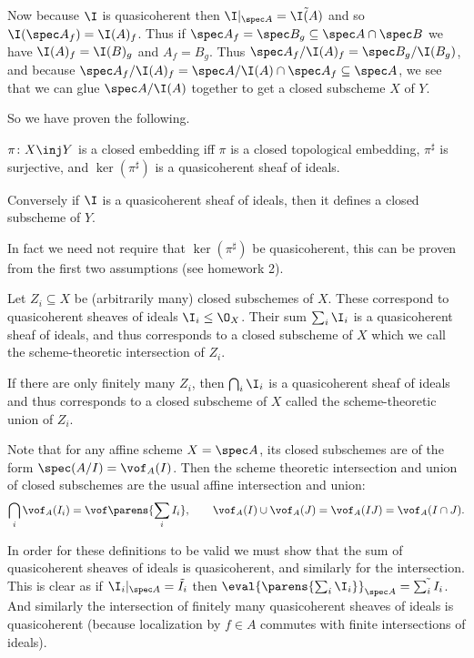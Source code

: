 Now because $\I$ is quasicoherent then $\I|_{\spec A}=\tilde{\I(A)}$ and so $\I(\spec A_f)=\I(A)_f$.
Thus if $\spec A_f=\spec B_g\subseteq\spec A\cap\spec B$ we have $\I(A)_f=\I(B)_g$ and $A_f=B_g$.
Thus $\spec A_f/\I(A)_f=\spec B_g/\I(B_g)$, and because $\spec A_f/\I(A)_f=\spec A/\I(A)\cap\spec A_f\subseteq\spec A$, we see that we can glue
$\spec A/\I(A)$ together to get a closed subscheme $X$ of $Y$.

So we have proven the following.

\bprop

    $\pi\colon X\inj Y$ is a closed embedding iff $\pi$ is a closed topological embedding, $\pi^\sharp$ is surjective, and $\ker(\pi^\sharp)$
    is a quasicoherent sheaf of ideals.

    Conversely if $\I$ is a quasicoherent sheaf of ideals, then it defines a closed subscheme of $Y$.

\eprop

\bremark

    In fact we need not require that $\ker(\pi^\sharp)$ be quasicoherent, this can be proven from the first
    two assumptions (see homework 2).

\eremark

\bdefn

    Let $Z_i\subseteq X$ be (arbitrarily many) closed subschemes of $X$.
    These correspond to quasicoherent sheaves of ideals $\I_i\leq\O_X$.
    Their sum $\sum_i\I_i$ is a quasicoherent sheaf of ideals, and thus corresponds to a closed
    subscheme of $X$ which we call the {\emphcolor scheme-theoretic intersection} of $Z_i$.

    If there are only finitely many $Z_i$, then $\bigcap_i\I_i$ is a quasicoherent sheaf of ideals
    and thus corresponds to a closed subscheme of $X$ called the {\emphcolor scheme-theoretic union}
    of $Z_i$.

\edefn

\bexam

    Note that for any affine scheme $X=\spec A$, its closed subschemes are of the form $\spec(A/I)=\vof_A(I)$.
    Then the scheme theoretic intersection and union of closed subschemes are the usual affine
    intersection and union:
    $$ \bigcap_i\vof_A(I_i) = \vof\parens{\sum_iI_i},\qquad \vof_A(I)\cup\vof_A(J) = \vof_A(IJ) =
    \vof_A(I\cap J) . $$

\eexam

In order for these definitions to be valid we must show that the sum of quasicoherent sheaves of ideals
is quasicoherent, and similarly for the intersection.
This is clear as if $\I_i|_{\spec A}=\tilde{I_i}$ then
$\eval{\parens{\sum_i\I_i}}_{\spec A}=\tilde{\sum_iI_i}$.
And similarly the intersection of finitely many quasicoherent sheaves of ideals is quasicoherent
(because localization by $f\in A$ commutes with finite intersections of ideals).

